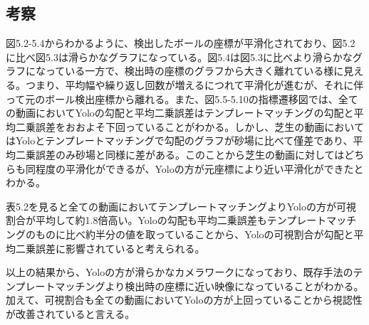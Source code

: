 \documentclass[11pt,a4j]{jreport}
\begin{document}


\subsection{考察}

図5.2-5.4からわかるように、検出したボールの座標が平滑化されており、図5.2に比べ図5.3は滑らかなグラフになっている。図5.4は図5.3に比べより滑らかなグラフになっている一方で、検出時の座標のグラフから大きく離れている様に見える。つまり、平均幅や繰り返し回数が増えるにつれて平滑化が進むが、それに伴って元のボール検出座標から離れる。また、図5.5-5.10の指標遷移図では、全ての動画においてYoloの勾配と平均二乗誤差はテンプレートマッチングの勾配と平均二乗誤差をおおよそ下回っていることがわかる。しかし、芝生の動画においてはYoloとテンプレートマッチングで勾配のグラフが砂場に比べて僅差であり、平均二乗誤差のみ砂場と同様に差がある。このことから芝生の動画に対してはどちらも同程度の平滑化ができるが、Yoloの方が元座標により近い平滑化ができたとわかる。

表5.2を見ると全ての動画においてテンプレートマッチングよりYoloの方が可視割合が平均して約1.8倍高い。Yoloの勾配も平均二乗誤差もテンプレートマッチングのものに比べ約半分の値を取っていることから、Yoloの可視割合が勾配と平均二乗誤差に影響されていると考えられる。

以上の結果から、Yoloの方が滑らかなカメラワークになっており、既存手法のテンプレートマッチングより検出時の座標に近い映像になっていることがわかる。加えて、可視割合も全ての動画においてYoloの方が上回っていることから視認性が改善されていると言える。
\end{document}
